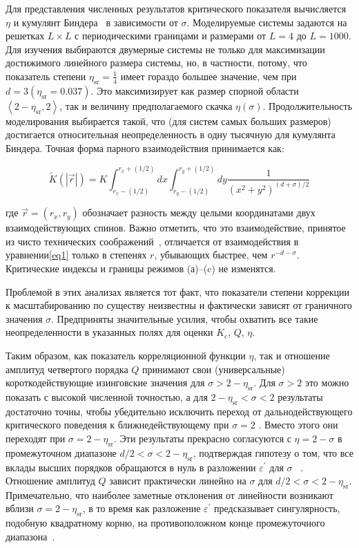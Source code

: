 Для представления численных результатов критического показателя вычисляется $\eta$ и кумулянт Биндера~\cite{10.1007/BF01293604} в зависимости от $\sigma$. Моделируемые системы задаются на решетках $L\times L$ с периодическими границами и размерами от $L=4$ до $L=1000$. 
Для изучения выбираются двумерные системы не только для максимизации достижимого линейного размера системы, но, в частности, потому, что показатель степени $\eta_{\mathrm{sr}}=\frac{1}{4}$ имеет гораздо большее значение, чем при $d=3\left(\eta_{\mathrm{sr}}=0.037\right)$. Это максимизирует как размер спорной области $\left\langle 2-\eta_{\mathrm{sr}}, 2\right\rangle$, так и величину предполагаемого скачка $\eta(\sigma)$. Продолжительность моделирования выбирается такой, что (для систем самых больших размеров) достигается относительная неопределенность в одну тысячную для кумулянта Биндера. Точная форма парного взаимодействия принимается как:

\begin{equation}
\tilde{K}(|\vec{r}|)=K \int_{r_{x}-(1 / 2)}^{r_{x}+(1 / 2)} d x \int_{r_{y}-(1 / 2)}^{r_{y}+(1 / 2)} d y \frac{1}{\left(x^{2}+y^{2}\right)^{(d+\sigma) / 2}}
\end{equation}

где $\vec r=\left(r_{x}, r_{y}\right)$ обозначает разность между целыми координатами двух взаимодействующих спинов. Важно отметить, что это взаимодействие, принятое из чисто технических соображений~\cite{10.1142/S0129183195000265}, отличается от взаимодействия в уравнении\ref{eq1} только в степенях $r$, убывающих быстрее, чем $r^{-d-\sigma}$. Критические индексы и границы режимов (а)–(c) не изменятся. 

Проблемой в этих анализах является тот факт, что показатели степени коррекции к масштабированию по существу неизвестны и фактически зависят от граничного значения $\sigma$. Предприняты значительные усилия, чтобы охватить все такие неопределенности в указанных полях для оценки $K_{c}$, $Q$, $\eta$.

Таким образом, как показатель корреляционной функции $\eta$, так и отношение амплитуд четвертого порядка $Q$ принимают свои (универсальные) короткодействующие изинговские значения для $\sigma>2-\eta_{\mathrm{sr}}$. Для $\sigma>2$ это можно показать с высокой численной точностью, а для $2-\eta_{\mathrm{sr}}<\sigma<2$ результаты достаточно точны, чтобы убедительно исключить переход от дальнодействующего критического поведения к ближнедействующему при $\sigma=2$ . Вместо этого они переходят при $\sigma=2-\eta_{\mathrm{sr}}$. 
Эти результаты прекрасно согласуются с $\eta=2-\sigma$ в промежуточном диапазоне $d/2<\sigma<2-\eta_{\mathrm{sr}}$, подтверждая гипотезу о том, что все вклады высших порядков обращаются в нуль в разложении $\varepsilon^{\prime}$ для $\sigma$ ~\cite{10.1103/PhysRevLett.29.917}. Отношение амплитуд $Q$ зависит практически линейно на $\sigma$ для $d/2<\sigma<2-\eta_{\mathrm{sr}}$.
Примечательно, что наиболее заметные отклонения от линейности возникают вблизи $\sigma=2-\eta_{\mathrm{sr}}$, в то время как разложение $\varepsilon^{\prime}$ предсказывает сингулярность, подобную квадратному корню, на противоположном конце промежуточного диапазона~\cite{10.1103/PhysRevE.60.7558}.


